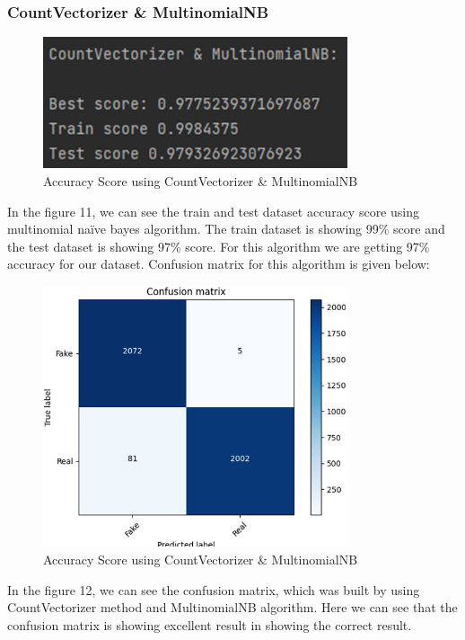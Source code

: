 \documentclass{article}
\begin{document}
    \subsubsection{CountVectorizer \& MultinomialNB}
     \begin{figure}[!h]
    \centering
    \includegraphics[width=0.8\textwidth]{image11.png}
    \caption{Accuracy Score using CountVectorizer \& MultinomialNB}
    \label{fig:label}
    \end{figure}\break
    In the figure 11, we can see the train and test dataset accuracy score using multinomial naïve bayes algorithm. The train dataset is showing 99\% score and the test dataset is showing 97\% score. For this algorithm we are getting 97\% accuracy for our dataset. Confusion matrix for this algorithm is given below:
    \break
    \begin{figure}[!h]
    \centering
    \includegraphics[width=0.8\textwidth]{image12.png}
    \caption{Accuracy Score using CountVectorizer \& MultinomialNB}
    \label{fig:label}
    \end{figure}\break
    In the figure 12, we can see the confusion matrix, which was built by using CountVectorizer method and MultinomialNB algorithm. Here we can see that the confusion matrix is showing excellent result in showing the correct result.
\end{document}
